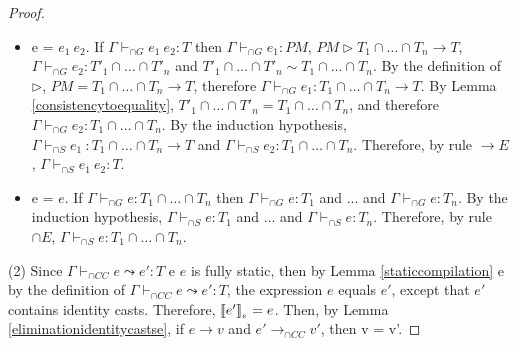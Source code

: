 \documentclass[a4paper]{article}
\begin{document}
\begin{proof}
\begin{itemize}
\begin{itemize}
    \end{itemize}
    \item e = $e_1\ e_2$.
    If $\Gamma \vdash_{\cap G} e_1\ e_2 : T$ then $\Gamma \vdash_{\cap G} e_1 : PM$, $PM \rhd T_1 \cap \ldots \cap T_n \rightarrow T$, $\Gamma \vdash_{\cap G} e_2 : T'_1 \cap \ldots \cap T'_n$ and $T'_1 \cap \ldots \cap T'_n \sim T_1 \cap \ldots \cap T_n$.
    By the definition of $\rhd$, $PM = T_1 \cap \ldots \cap T_n \rightarrow T$, therefore $\Gamma \vdash_{\cap G} e_1 : T_1 \cap \ldots \cap T_n \rightarrow T$.
    By Lemma \ref{consistencytoequality}, $T'_1 \cap \ldots \cap T'_n = T_1 \cap \ldots \cap T_n$, and therefore $\Gamma \vdash_{\cap G} e_2 : T_1 \cap \ldots \cap T_n$.
    By the induction hypothesis, $\Gamma \vdash_{\cap S} e_1\ : T_1 \cap \ldots \cap T_n \rightarrow T$ and $\Gamma \vdash_{\cap S} e_2 : T_1 \cap \ldots \cap T_n$.
    Therefore, by rule ${\rightarrow} E$, $\Gamma \vdash_{\cap S} e_1\ e_2 : T$.
    \item e = $e$.
    If $\Gamma \vdash_{\cap G} e : T_1 \cap \ldots \cap T_n$ then $\Gamma \vdash_{\cap G} e : T_1$ and ... and $\Gamma \vdash_{\cap G} e : T_n$.
    By the induction hypothesis, $\Gamma \vdash_{\cap S} e : T_1$ and ... and $\Gamma \vdash_{\cap S} e : T_n$.
    Therefore, by rule ${\cap} E$, $\Gamma \vdash_{\cap S} e : T_1 \cap \ldots \cap T_n$.\\
\end{itemize}
(2) Since $\Gamma \vdash_{\cap CC} e \leadsto e' : T$ e $e$ is fully static, then by Lemma \ref{staticcompilation} e by the definition of $\Gamma \vdash_{\cap CC} e \leadsto e' : T$, the expression $e$ equals $e'$, except that $e'$ contains identity casts.
Therefore, $\llbracket e' \rrbracket_{_e} = e$.
Then, by Lemma \ref{eliminationidentitycastse}, if $e \longrightarrow v$ and $e' \longrightarrow_{\cap CC} v'$, then v = v'.
\end{proof}
\end{document}
